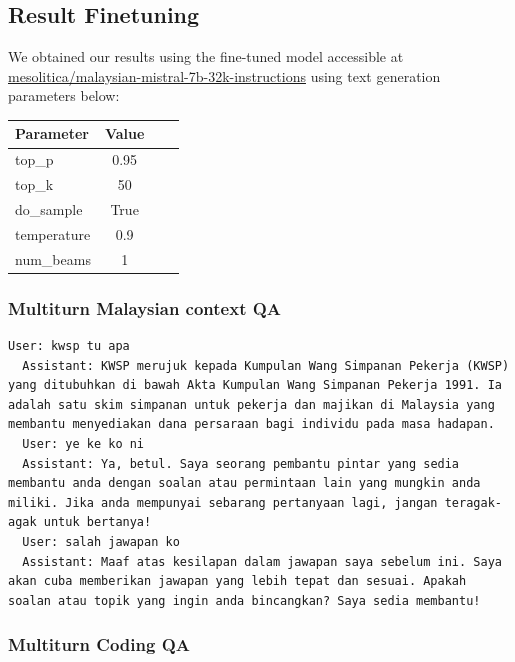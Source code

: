 \documentclass{article}
\begin{document}
\subsection{Result Finetuning}\label{sec:result-finetuning}

We obtained our results using the fine-tuned model accessible at \href{https://huggingface.co/mesolitica/malaysian-mistral-7b-32k-instructions}{mesolitica/malaysian-mistral-7b-32k-instructions} using text generation parameters below:

\begin{table}[h]
  \centering
  \begin{tabular}{lccl}
    \hline
    \textbf{Parameter} & \textbf{Value} \\
    \hline
    top\_p             & 0.95           \\
    top\_k             & 50             \\
    do\_sample         & True           \\
    temperature        & 0.9            \\
    num\_beams         & 1              \\
    \hline
  \end{tabular}
\end{table}

\pagebreak

\subsubsection{Multiturn Malaysian context QA}

\begin{lstlisting}[breaklines=true]
  User: kwsp tu apa
  Assistant: KWSP merujuk kepada Kumpulan Wang Simpanan Pekerja (KWSP) yang ditubuhkan di bawah Akta Kumpulan Wang Simpanan Pekerja 1991. Ia adalah satu skim simpanan untuk pekerja dan majikan di Malaysia yang membantu menyediakan dana persaraan bagi individu pada masa hadapan.
  User: ye ke ko ni
  Assistant: Ya, betul. Saya seorang pembantu pintar yang sedia membantu anda dengan soalan atau permintaan lain yang mungkin anda miliki. Jika anda mempunyai sebarang pertanyaan lagi, jangan teragak-agak untuk bertanya!
  User: salah jawapan ko
  Assistant: Maaf atas kesilapan dalam jawapan saya sebelum ini. Saya akan cuba memberikan jawapan yang lebih tepat dan sesuai. Apakah soalan atau topik yang ingin anda bincangkan? Saya sedia membantu!
\end{lstlisting}

\subsubsection{Multiturn Coding QA}
\end{document}
